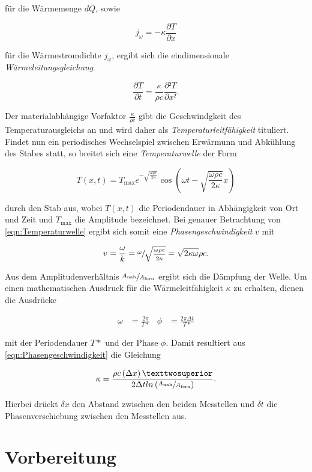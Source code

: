 für die Wärmemenge $dQ$, sowie

\begin{equation}
    j_\omega = -\kappa \frac{\partial{}T}{\partial{}x}
\end{equation}

für die Wärmestromdichte $j_\omega$, ergibt sich die eindimensionale \emph{Wärmeleitungsgleichung}

\begin{equation}
    \frac{\partial T}{\partial t} = \frac{\kappa}{\rho c} \frac{\partial² T}{\partial x²}.
\end{equation}

Der materialabhängige Vorfaktor $\frac{\kappa}{\rho c}$ gibt die Geschwindgkeit des Temperaturausgleichs 
an und wird daher als \emph{Temperaturleitfähigkeit} tituliert. \\
Findet nun ein periodisches Wechselspiel zwischen Erwärmunn und Abkühlung des Stabes statt,
so breitet sich eine \emph{Temperaturwelle} der Form

\begin{equation}
\label{eqn:Temperaturwelle}
    T(x,t) = T_{\mathrm{max}} e^{-\sqrt{\frac{\omega \rho c}{2\kappa}}}\cos\left(\omega t - \sqrt{\frac{\omega \rho c}{2\kappa}}x\right)
\end{equation}

durch den Stab aus, wobei $T(x,t)$ die Periodendauer in Abhängigkeit von Ort und Zeit und $T_\text{max}$ die Amplitude bezeichnet.
Bei genauer Betrachtung von \eqref{eqn:Temperaturwelle} ergibt sich somit eine \emph{Phasengeschwindigkeit} $v$ mit 

\begin{equation}
\label{eqn:Phasengeschwindigkeit}
    v = \frac{\omega}{k} = \sfrac{\omega}{\sqrt{\frac{\omega \rho c}{2\kappa}}} = \sqrt{2\kappa \omega}{\rho c}.
\end{equation}

Aus dem Amplitudenverhältnis $\sfrac{A_\text{nah}}{A_\text{fern}}$ ergibt sich die Dämpfung der Welle. Um einen mathematischen Ausdruck 
für die Wärmeleitfähigkeit $\kappa$ zu erhalten, dienen die Ausdrücke 

\begin{align*}
    \omega &= \frac{2\pi}{T*} & \phi &= \frac{2\pi \Delta t}{T*}
\end{align*}

mit der Periodendauer $T*$ und der Phase $\phi$. Damit resultiert aus \eqref{eqn:Phasengeschwindigkeit} die Gleichung

\begin{equation}
    \kappa = \frac{\rho c \left(\Delta x\right)²}{2\Delta t ln\left(\sfrac{A_\text{nah}}{A_\text{fern}}\right)}.
\end{equation}

Hierbei drückt $\delta x$ den Abstand zwischen den beiden Messtellen und $\delta t$ die Phasenverschiebung zwischen den Messtellen aus.


\section{Vorbereitung}
\cite{sample}


